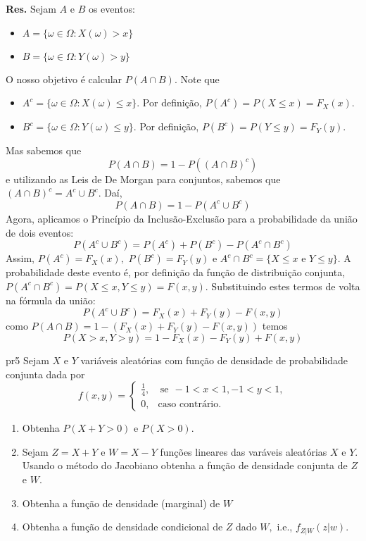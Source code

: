 {\small {\bf Res.} Sejam $A$ e $B$ os eventos:
\begin{itemize}
	\item $A = \{ \omega \in \Omega : X(\omega) > x \}$
	\item $B = \{ \omega \in \Omega : Y(\omega) > y \}$
\end{itemize} O nosso objetivo é calcular $P(A \cap B)$. Note que
\begin{itemize}
	\item $A^c = \{ \omega \in \Omega : X(\omega) \le x \}$. Por definição, $P(A^c) = P(X \le x) = F_X(x)$.
	\item $B^c = \{ \omega \in \Omega : Y(\omega) \le y \}$. Por definição, $P(B^c) = P(Y \le y) = F_Y(y)$.
\end{itemize}
Mas  sabemos que $$ P(A \cap B) = 1 - P((A \cap B)^c) $$ e 
utilizando as Leis de De Morgan para conjuntos, sabemos que $(A \cap B)^c = A^c \cup B^c$. Daí, 
$$ P(A \cap B) = 1 - P(A^c \cup B^c) $$
Agora, aplicamos o Princípio da Inclusão-Exclusão para a probabilidade da união de dois eventos:
$$ P(A^c \cup B^c) = P(A^c) + P(B^c) - P(A^c \cap B^c) $$
Assim, $P(A^c) = F_X(x),$ $P(B^c) = F_Y(y)$ e $A^c \cap B^c = \{X \le x \text{ e } Y \le y\}$. A probabilidade deste evento é, por definição da função de distribuição conjunta, $P(A^c \cap B^c) = P(X \le x, Y \le y) = F(x,y)$. Substituindo estes termos de volta na fórmula da união:
$$ P(A^c \cup B^c) = F_X(x) + F_Y(y) - F(x,y) $$
como  $ P(A \cap B) = 1 - \left( F_X(x) + F_Y(y) - F(x,y) \right) $ temos
$$ P(X>x, Y>y) = 1 - F_X(x) - F_Y(y) + F(x,y) $$
}



\begin{problema}{}{pr5}
Sejam $X$ e $Y$ variáveis aleatórias com função de densidade de probabilidade conjunta dada por 
$$ f(x,y) = 
\begin{cases}
	\frac{1}{4}, & \ \text{se} \  \  -1<x<1,  -1<y<1, \\
	0, &  \text{caso contrário.}
\end{cases}
$$

\begin{enumerate}
	\item  Obtenha $P(X+Y> 0)$ e $P(X>0).$
	\item Sejam $Z=X+Y$ e $W=X-Y$ funções lineares das varáveis aleatórias $X$ e $Y.$ Usando o método do Jacobiano obtenha a função de densidade conjunta de $Z$ e $W.$
		\item Obtenha a função de densidade (marginal) de $W$ 
	\item  Obtenha a função de densidade condicional de $Z$ dado $W,$ i.e., $f_{Z|W}(z|w).$
\end{enumerate}
\end{problema}

